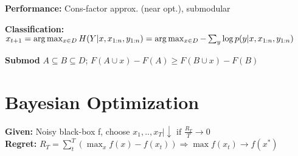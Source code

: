 \textbf{Performance:} Cons-factor approx. (near opt.), submodular
\begin{comment}
	\textbf{Proof:} Via submodularity...\
\end{comment}

\textbf{Classification:} $x_{t+1} = \arg \max_{x \in D} H(Y|x,x_{1:n}, y_{1:n})\\
= \arg \max_{x \in D} -\sum_y \log p(y| x,x_{1:n}, y_{1:n})$\\
\begin{comment}
	\textbf{Intuition, heteroscedastic case:} The most uncertain label is not necessarily the most informative. If we have binary classification, the point closest to the division boundary are chosen.\\ 
	But, those are also the points with the largest variance (aleatoric noise), since they are farthest away from the "source" cluster. So if the aleatoric noise is high, the decision boundary might choose weird points and don't get a proper fit.\\
\end{comment}

\textbf{Submod} $A \subseteq B \subseteq D$; $F(A \cup {x}) - F(A) \geq F(B \cup {x}) - F(B)$

\section{Bayesian Optimization}
\begin{comment}
	For example synthesizing molecules or choosing hyperparameters of neural networks, we want some kind of process to derive the next parameters to try out.
	The evaluation of the parameters is very expensive.\\
	\textbf{Tradeoff:} Exploitation vs. exploration. We don't want to make experience with clearly suboptimal results, so we need to balance these two factors.\\
	\textbf{Key Idea:} Learn an approximate model of a blackbox function, which then can be used to plan what samples to take next. The samples we get are noisy: $y_t = f(x_t) + \epsilon_t$.\\
	\textbf{Goal:} How to sequentially pick x's to find $\max_x f(x)$ with minimal samples. Find an aquisition function that does this.\\
\end{comment}
\textbf{Given:} Noisy  black-box f, choose $x_1,..,x_T| \downarrow \text{ if } \frac{R_T}{T} \rightarrow 0 $\\
\textbf{Regret:} $R_T = \sum_t^T(\max_x f(x) - f(x_t)) \Rightarrow \max f(x_t) \rightarrow f(x^*)$\\
\begin{comment}
	Given a set of possible inputs D, and noisy blackbox function f, choose $x_s$ and observe $y_t = f(x_t) + \epsilon_t$.\\
	The cumulative regret tells us the error if we knew the maximum in advance. It has to go to zero over time, to reach the actual maximum.\\
	Algorithms have regret bounds, which jufge the effectiveness of an algorithm.\\
\end{comment}


